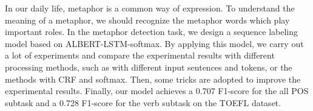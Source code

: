 In our daily life, metaphor is a common way of expression. To understand the meaning of a metaphor, we should recognize the metaphor words which play important roles. In the metaphor detection task, we design a sequence labeling model based on ALBERT-LSTM-softmax. By applying this model, we carry out a lot of experiments and compare the experimental results with different processing methods, such as with different input sentences and tokens, or the methods with CRF and softmax. Then, some tricks are adopted to improve the experimental results. Finally, our model achieves a 0.707 F1-score for the all POS subtask and a 0.728 F1-score for the verb subtask on the TOEFL dataset.
